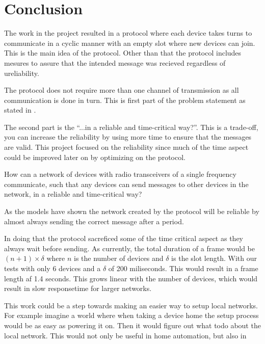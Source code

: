 \chapter{Conclusion}

The work in the project resulted in a protocol where each device takes turns to communicate in a cyclic manner with an empty slot where new devices can join.
This is the main idea of the protocol.
Other than that the protocol includes mesures to assure that the intended message was recieved regardless of ureliability.

The protocol does not require more than one channel of transmission as all communication is done in turn.
This is first part of the problem statement as stated in .

The second part is the \enquote{...in a reliable and time-critical way?}.
This is a trade-off, you can increase the reliability by using more time to ensure that the messages are valid.
This project focused on the reliability since much of the time aspect could be improved later on by optimizing on the protocol.









How can a network of devices with radio transceivers of a single frequency communicate, such that any devices can send messages to other devices in the network, in a reliable and time-critical way?

As the models have shown the network created by the protocol will be reliable by almost always sending the correct message after a period.


In doing that the protocol sacreficed some of the time critical aspect as they always wait before sending.
As currently, the total duration of a frame would be $(n + 1) \times \delta$ where $n$ is the number of devices and $\delta$ is the slot length.
With our tests with only 6 devices and a $\delta$ of 200 miliseconds.
This would result in a frame length af 1.4 seconds.
This grows linear with the number of devices, which would result in slow responsetime for larger networks.












This work could be a step towards making an easier way to setup local networks.
For example imagine a world where when taking a device home the setup process would be as easy as powering it on.
Then it would figure out what todo about the local network.
This would not only be useful in home automation, but also in 
